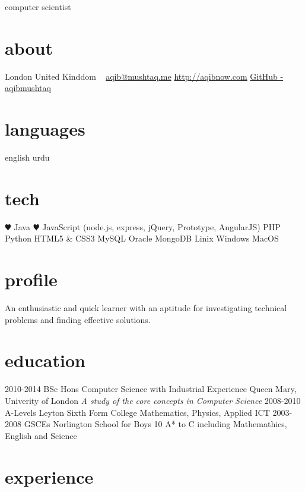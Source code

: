 \documentclass[]{friggeri-cv}
\begin{document}
       {computer scientist}

\begin{aside}
  \section{about}
    London
    United Kinddom
    ~
    \href{mailto:aqib@mushtaq.me}{aqib@mushtaq.me}
    \href{http://aqibnow.com}{http://aqibnow.com}
    \href{https://github.com/aqibmushtaq}{GitHub - aqibmushtaq}
  \section{languages}
    english
    urdu
  \section{tech}
    {\color{red} $\varheartsuit$} Java
    {\color{red} $\varheartsuit$} JavaScript
    (node.js, express, jQuery, Prototype, AngularJS)
    PHP
    Python
    HTML5 \& CSS3
    MySQL
    Oracle
    MongoDB
    Linix
    Windows
    MacOS
\end{aside}

\section{profile}

An enthusiastic and quick learner with an aptitude for investigating technical problems and finding effective solutions.

\section{education}

\begin{entrylist}
  \entry
    {2010-2014}
    {BSc Hons {\normalfont Computer Science with Industrial Experience}}
    {Queen Mary, Univerity of London}
    {\emph{A study of the core concepts in Computer Science}}
  \entry
    {2008-2010}
    {A-Levels}
    {Leyton Sixth Form College}
    {Mathematics, Physics, Applied ICT}
  \entry
    {2003-2008}
    {GSCEs}
    {Norlington School for Boys}
    {10 A* to C including Mathemathics, English and Science}
\end{entrylist}

\section{experience}
\end{document}
